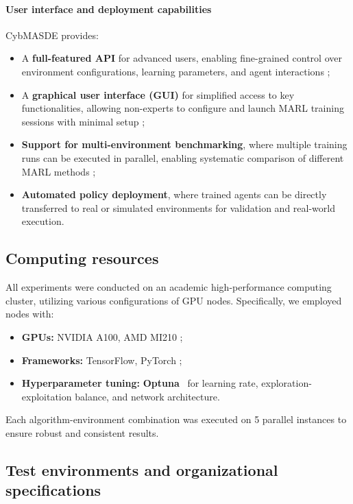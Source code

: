\documentclass[pdflatex,sn-mathphys-num]{sn-jnl}%
\theoremstyle{thmstyleone}%
\theoremstyle{thmstyletwo}%
\theoremstyle{thmstylethree}%
\begin{document}
\paragraph{User interface and deployment capabilities}
CybMASDE provides:
\begin{itemize}
    \item A \textbf{full-featured API} for advanced users, enabling fine-grained control over environment configurations, learning parameters, and agent interactions ;
    \item A \textbf{graphical user interface (GUI)} for simplified access to key functionalities, allowing non-experts to configure and launch MARL training sessions with minimal setup ;
    \item \textbf{Support for multi-environment benchmarking}, where multiple training runs can be executed in parallel, enabling systematic comparison of different MARL methods ;
    \item \textbf{Automated policy deployment}, where trained agents can be directly transferred to real or simulated environments for validation and real-world execution.
\end{itemize}


\subsection{Computing resources}

All experiments were conducted on an academic high-performance computing cluster, utilizing various configurations of GPU nodes. Specifically, we employed nodes with:
\begin{itemize}
    \item \textbf{GPUs:} NVIDIA A100, AMD MI210 ;
    \item \textbf{Frameworks:} TensorFlow, PyTorch ;
    \item \textbf{Hyperparameter tuning:} \textbf{Optuna}~\cite{akiba2019optuna} for learning rate, exploration-exploitation balance, and network architecture.
\end{itemize}

Each algorithm-environment combination was executed on 5 parallel instances to ensure robust and consistent results.

\subsection{Test environments and organizational specifications}
\end{document}
